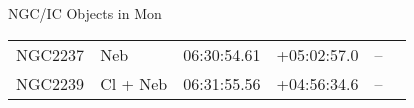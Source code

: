 \begin{block}{NGC/IC Objects in Mon}
  \centering
  \begin{tabularx}{\textwidth}{llrrll} 
    NGC2237 & Neb & 06:30:54.61 & +05:02:57.0  & -- \\ 
    NGC2239 & Cl + Neb & 06:31:55.56 & +04:56:34.6  & -- \\ 
  \end{tabularx}
\end{block}